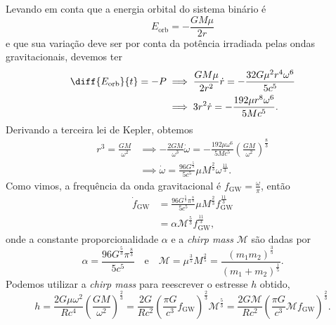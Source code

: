 Levando em conta que a energia orbital do sistema binário é
\begin{equation*}
    E_\mathrm{orb} = - \frac{GM \mu}{2r}
\end{equation*}
e que sua variação deve ser por conta da potência irradiada pelas ondas gravitacionais, devemos ter
\begin{align*}
    \diff{E_\mathrm{orb}}{t} = - P &\implies \frac{GM\mu}{2r^2}\dot{r} = -\frac{32 G \mu^2r^4 \omega^6}{5c^5}\\
                                   &\implies 3r^2 \dot{r} = - \frac{192\mu r^8 \omega^6}{5Mc^5}.
\end{align*}
Derivando a terceira lei de Kepler, obtemos
\begin{align*}
    r^3 = \frac{GM}{\omega^2} &\implies - \frac{2GM}{\omega^3}\dot\omega = - \frac{192\mu \omega^6}{5Mc^5}\left(\frac{GM}{\omega^2}\right)^{\frac83}\\
                              &\implies \dot\omega = \frac{96 G^{\frac53}}{5c^5} \mu M^\frac23 \omega^\frac{11}{3}.
\end{align*}
Como vimos, a frequência da onda gravitacional é \(f_\mathrm{GW} = \frac{\omega}{\pi}\), então
\begin{align*}
    \dot{f}_\mathrm{GW} &= \frac{96 G^\frac53 \pi^\frac83}{5c^5} \mu M^\frac23 f_\mathrm{GW}^\frac{11}{3}\\
                        &= \alpha \mathcal{M}^\frac53 f_\mathrm{GW}^\frac{11}{3},
\end{align*}
onde a constante proporcionalidade \(\alpha\) e a \emph{chirp mass} \(\mathcal{M}\) são dadas por
\begin{equation*}
    \alpha = \frac{96G^\frac53 \pi^\frac83}{5c^5}\quad\text{e}\quad
    \mathcal{M} = \mu^\frac35 M^\frac25 = \frac{(m_1m_2)^\frac35}{(m_1 + m_2)^\frac15}.
\end{equation*}
Podemos utilizar a \emph{chirp mass} para reescrever o estresse \(h\) obtido,
\begin{equation*}
    h = \frac{2G\mu \omega^2}{Rc^4}\left(\frac{GM}{\omega^2}\right)^\frac23 = \frac{2G}{Rc^2}\left(\frac{\pi G}{c^3}f_\mathrm{GW}\right)^\frac23 \mathcal{M}^{\frac53} = \frac{2G\mathcal{M}}{Rc^2}\left(\frac{\pi G}{c^3} \mathcal{M} f_\mathrm{GW}\right)^\frac23.
\end{equation*}

